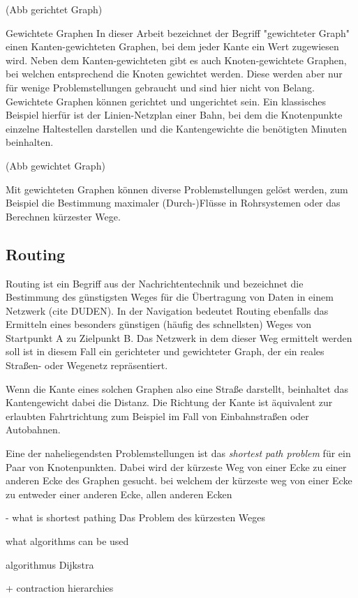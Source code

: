 \documentclass[10pt,a4paper]{article}
\begin{document}
(Abb gerichtet Graph)

Gewichtete Graphen
In dieser Arbeit bezeichnet der Begriff "gewichteter Graph" einen Kanten-gewichteten Graphen, bei dem jeder Kante ein Wert zugewiesen wird. Neben dem Kanten-gewichteten gibt es auch Knoten-gewichtete Graphen, bei welchen entsprechend die Knoten gewichtet werden. Diese werden aber nur für wenige Problemstellungen gebraucht und sind hier nicht von Belang. Gewichtete Graphen können gerichtet und ungerichtet sein. Ein klassisches Beispiel hierfür ist der Linien-Netzplan einer Bahn, bei dem die Knotenpunkte einzelne Haltestellen darstellen und die Kantengewichte die benötigten Minuten beinhalten.

(Abb gewichtet Graph)

Mit gewichteten Graphen können diverse Problemstellungen gelöst werden, zum Beispiel die Bestimmung maximaler (Durch-)Flüsse in Rohrsystemen oder das Berechnen kürzester Wege.

\subsection{Routing}

Routing ist ein Begriff aus der Nachrichtentechnik und bezeichnet die Bestimmung des günstigsten Weges für die Übertragung von Daten in einem Netzwerk (cite DUDEN). In der Navigation bedeutet Routing ebenfalls das Ermitteln eines besonders günstigen (häufig des schnellsten) Weges von Startpunkt A zu Zielpunkt B. Das Netzwerk in dem dieser Weg ermittelt werden soll ist in diesem Fall ein gerichteter und gewichteter Graph, der ein reales Straßen- oder Wegenetz repräsentiert.

Wenn die Kante eines solchen Graphen also eine Straße darstellt, beinhaltet das Kantengewicht dabei die Distanz. Die Richtung der Kante ist äquivalent zur erlaubten Fahrtrichtung zum Beispiel im Fall von Einbahnstraßen oder Autobahnen.

Eine der naheliegendsten Problemstellungen ist das \textit{shortest path problem} für ein Paar von Knotenpunkten. Dabei wird der kürzeste Weg von einer Ecke zu einer anderen Ecke des Graphen gesucht. bei welchem der kürzeste weg von einer Ecke zu entweder einer anderen Ecke, allen anderen Ecken 

- what is shortest pathing
Das Problem des kürzesten Weges 


what algorithms can be used

algorithmus Dijkstra 

+ contraction hierarchies
\end{document}
